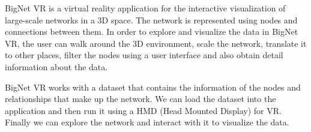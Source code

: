 %
%



BigNet VR is a virtual reality application for the interactive visualization of large-scale networks in a 3D space. The network is represented using nodes and connections between them. In order to explore and visualize the data in BigNet VR, the user can walk around the 3D environment, scale the network, translate it to other places, filter the nodes using a user interface and also obtain detail information about the data.

BigNet VR works with a dataset that contains the information of the nodes and relationships that make up the network. We can load the dataset into the application and then run it using a HMD (Head Mounted Display) for VR. Finally we can explore the network and interact with it to visualize the data.

